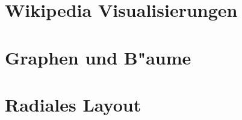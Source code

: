 \section{Wikipedia Visualisierungen}
\section{Graphen und B"aume}
\section{Radiales Layout}








